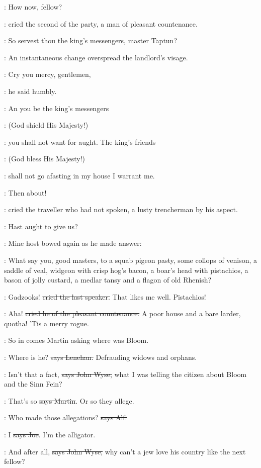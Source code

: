 \power:
How now, fellow?

:
cried the second of the party, a man of pleasant countenance.

\power:
So servest thou the king's messengers, master Taptun?

:
An instantaneous change overspread the landlord's visage.

\terry:
Cry you mercy, gentlemen,

:
he said humbly.

\terry:
An you be the king's messengers

:
(God shield His Majesty!)

\terry:
you shall not want for aught. The king's friends

:
(God bless His Majesty!)

\terry:
shall not go afasting in my house I warrant me.

\crofton:
Then about!

:
cried the traveller who had not spoken,
a lusty trencherman by his aspect.

\crofton:
Hast aught to give us?

:
Mine host bowed again as he made answer:

\terry:
What say you, good masters,
to a squab pigeon pasty, some collops of
venison, a saddle of veal, widgeon with crisp hog's bacon, a boar's head
with pistachios, a bason of jolly custard, a medlar tansy and a flagon of
old Rhenish?

\crofton:
Gadzooks! \sout{cried the last speaker.}
That likes me well. Pistachios!

\power:
Aha! \sout{cried he of the pleasant countenance.}
A poor house and a bare
larder, quotha! 'Tis a merry rogue.

\Nq:
So in comes Martin asking where was Bloom.

\lenehan:
Where is he? \sout{says Lenehan.}
Defrauding widows and orphans.

\johnwyse:
Isn't that a fact, \sout{says John Wyse,}
what I was telling the citizen about
Bloom and the Sinn Fein?

\cunningham:
That's so \sout{says Martin}.
Or so they allege.

\bergan:
Who made those allegations? \sout{says Alf.}

\joe:
I \sout{says Joe}. I'm the alligator.

\johnwyse:
And after all, \sout{says John Wyse,}
why can't a jew love his country like the
next fellow?


